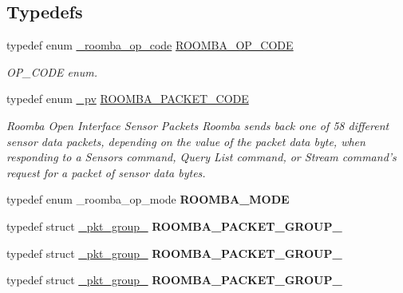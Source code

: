 \subsection*{Typedefs}
\begin{DoxyCompactItemize}
\item 
typedef enum \hyperlink{group__roomba-lib_ga305e17dfb7050ad83ea49ded2e6a2e24}{\+\_\+roomba\+\_\+op\+\_\+code} \hyperlink{group__roomba-lib_gaa48d04e007e0ae60ee9bc055a5a159fe}{R\+O\+O\+M\+B\+A\+\_\+\+O\+P\+\_\+\+C\+O\+D\+E}
\begin{DoxyCompactList}\small\item\em O\+P\+\_\+\+C\+O\+D\+E enum. \end{DoxyCompactList}\item 
typedef enum \hyperlink{group__roomba-lib_ga46f008b5055c4a08d3123c6a3478373e}{\+\_\+pv} \hyperlink{group__roomba-lib_gada33faf3aeb650fa045d8516c6257174}{R\+O\+O\+M\+B\+A\+\_\+\+P\+A\+C\+K\+E\+T\+\_\+\+C\+O\+D\+E}
\begin{DoxyCompactList}\small\item\em Roomba Open Interface Sensor Packets Roomba sends back one of 58 different sensor data packets, depending on the value of the packet data byte, when responding to a Sensors command, Query List command, or Stream command’s request for a packet of sensor data bytes. \end{DoxyCompactList}\item 
\hypertarget{group__roomba-lib_ga060a7d130526614e3fbff4b98ddc0bb3}{}typedef enum \+\_\+roomba\+\_\+op\+\_\+mode {\bfseries R\+O\+O\+M\+B\+A\+\_\+\+M\+O\+D\+E}\label{group__roomba-lib_ga060a7d130526614e3fbff4b98ddc0bb3}

\item 
\hypertarget{group__roomba-lib_ga74ecb9c5d0e098aaa7487dfe597f86cb}{}typedef struct \hyperlink{struct__pkt__group__0}{\+\_\+pkt\+\_\+group\+\_} {\bfseries R\+O\+O\+M\+B\+A\+\_\+\+P\+A\+C\+K\+E\+T\+\_\+\+G\+R\+O\+U\+P\+\_}\label{group__roomba-lib_ga74ecb9c5d0e098aaa7487dfe597f86cb}

\item 
\hypertarget{group__roomba-lib_ga2f1fed18d4402cd13047ae8783d17388}{}typedef struct \hyperlink{struct__pkt__group__1}{\+\_\+pkt\+\_\+group\+\_} {\bfseries R\+O\+O\+M\+B\+A\+\_\+\+P\+A\+C\+K\+E\+T\+\_\+\+G\+R\+O\+U\+P\+\_}\label{group__roomba-lib_ga2f1fed18d4402cd13047ae8783d17388}

\item 
\hypertarget{group__roomba-lib_ga6eba4d343cf4f71cf5dbdd54b17c6941}{}typedef struct \hyperlink{struct__pkt__group__2}{\+\_\+pkt\+\_\+group\+\_} {\bfseries R\+O\+O\+M\+B\+A\+\_\+\+P\+A\+C\+K\+E\+T\+\_\+\+G\+R\+O\+U\+P\+\_}\label{group__roomba-lib_ga6eba4d343cf4f71cf5dbdd54b17c6941}


\end{DoxyCompactItemize}
